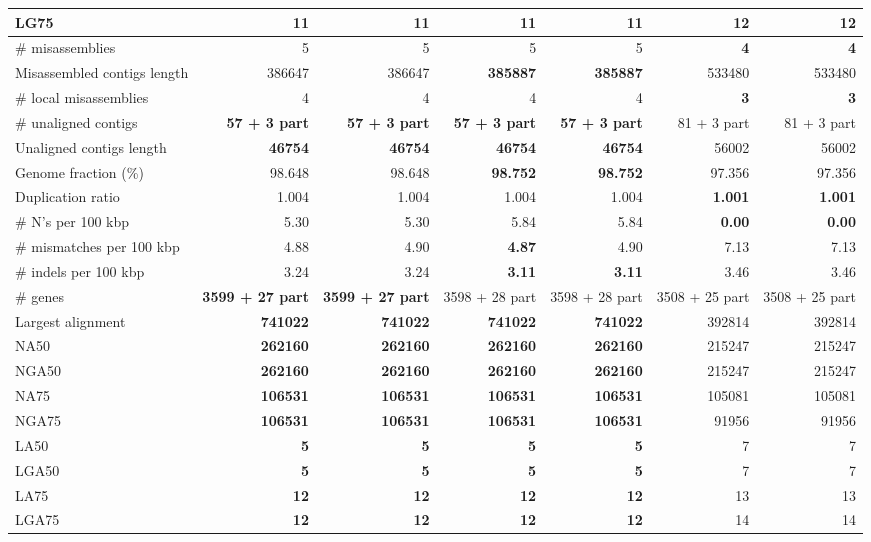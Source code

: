 \documentclass[12pt,a4paper]{article}
\begin{document}
\begin{table}[ht]
\begin{center}
\begin{tabular}{|l*{6}{|r}|}
LG75 & {\bf 11} & {\bf 11} & {\bf 11} & {\bf 11} & 12 & 12 \\ \hline
\# misassemblies & 5 & 5 & 5 & 5 & {\bf 4} & {\bf 4} \\ \hline
Misassembled contigs length & 386647 & 386647 & {\bf 385887} & {\bf 385887} & 533480 & 533480 \\ \hline
\# local misassemblies & 4 & 4 & 4 & 4 & {\bf 3} & {\bf 3} \\ \hline
\# unaligned contigs & {\bf 57 + 3 part} & {\bf 57 + 3 part} & {\bf 57 + 3 part} & {\bf 57 + 3 part} & 81 + 3 part & 81 + 3 part \\ \hline
Unaligned contigs length & {\bf 46754} & {\bf 46754} & {\bf 46754} & {\bf 46754} & 56002 & 56002 \\ \hline
Genome fraction (\%) & 98.648 & 98.648 & {\bf 98.752} & {\bf 98.752} & 97.356 & 97.356 \\ \hline
Duplication ratio & 1.004 & 1.004 & 1.004 & 1.004 & {\bf 1.001} & {\bf 1.001} \\ \hline
\# N's per 100 kbp & 5.30 & 5.30 & 5.84 & 5.84 & {\bf 0.00} & {\bf 0.00} \\ \hline
\# mismatches per 100 kbp & 4.88 & 4.90 & {\bf 4.87} & 4.90 & 7.13 & 7.13 \\ \hline
\# indels per 100 kbp & 3.24 & 3.24 & {\bf 3.11} & {\bf 3.11} & 3.46 & 3.46 \\ \hline
\# genes & {\bf 3599 + 27 part} & {\bf 3599 + 27 part} & 3598 + 28 part & 3598 + 28 part & 3508 + 25 part & 3508 + 25 part \\ \hline
Largest alignment & {\bf 741022} & {\bf 741022} & {\bf 741022} & {\bf 741022} & 392814 & 392814 \\ \hline
NA50 & {\bf 262160} & {\bf 262160} & {\bf 262160} & {\bf 262160} & 215247 & 215247 \\ \hline
NGA50 & {\bf 262160} & {\bf 262160} & {\bf 262160} & {\bf 262160} & 215247 & 215247 \\ \hline
NA75 & {\bf 106531} & {\bf 106531} & {\bf 106531} & {\bf 106531} & 105081 & 105081 \\ \hline
NGA75 & {\bf 106531} & {\bf 106531} & {\bf 106531} & {\bf 106531} & 91956 & 91956 \\ \hline
LA50 & {\bf 5} & {\bf 5} & {\bf 5} & {\bf 5} & 7 & 7 \\ \hline
LGA50 & {\bf 5} & {\bf 5} & {\bf 5} & {\bf 5} & 7 & 7 \\ \hline
LA75 & {\bf 12} & {\bf 12} & {\bf 12} & {\bf 12} & 13 & 13 \\ \hline
LGA75 & {\bf 12} & {\bf 12} & {\bf 12} & {\bf 12} & 14 & 14 \\ \hline
\end{tabular}
\end{center}
\end{table}
\end{document}
